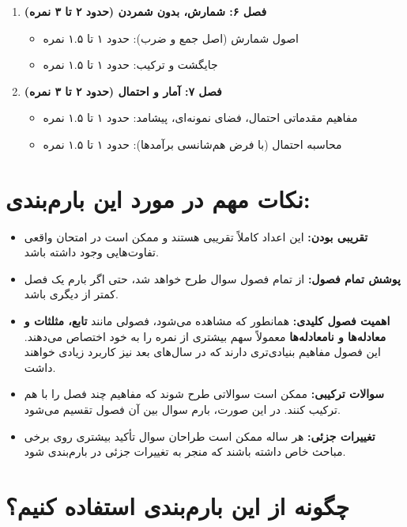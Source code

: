 \documentclass[12pt,a4paper]{article}
\begin{document}
\begin{enumerate}[label=\textbf{\arabic*.}, wide, labelindent=0pt]
    \item \textbf{فصل ۶: شمارش، بدون شمردن (حدود ۲ تا ۳ نمره)}
    \begin{itemize}
        \item اصول شمارش (اصل جمع و ضرب): حدود ۱ تا ۱.۵ نمره
        \item جایگشت و ترکیب: حدود ۱ تا ۱.۵ نمره
    \end{itemize}

    \item \textbf{فصل ۷: آمار و احتمال (حدود ۲ تا ۳ نمره)}
    \begin{itemize}
        \item مفاهیم مقدماتی احتمال، فضای نمونه‌ای، پیشامد: حدود ۱ تا ۱.۵ نمره
        \item محاسبه احتمال (با فرض هم‌شانسی برآمدها): حدود ۱ تا ۱.۵ نمره
    \end{itemize}
\end{enumerate}

\section*{نکات مهم در مورد این بارم‌بندی:}

\begin{itemize}
    \item \textbf{تقریبی بودن:} این اعداد کاملاً تقریبی هستند و ممکن است در امتحان واقعی تفاوت‌هایی وجود داشته باشد.
    \item \textbf{پوشش تمام فصول:} از تمام فصول سوال طرح خواهد شد، حتی اگر بارم یک فصل کمتر از دیگری باشد.
    \item \textbf{اهمیت فصول کلیدی:} همانطور که مشاهده می‌شود، فصولی مانند \textbf{تابع، مثلثات و معادله‌ها و نامعادله‌ها} معمولاً سهم بیشتری از نمره را به خود اختصاص می‌دهند. این فصول مفاهیم بنیادی‌تری دارند که در سال‌های بعد نیز کاربرد زیادی خواهند داشت.
    \item \textbf{سوالات ترکیبی:} ممکن است سوالاتی طرح شوند که مفاهیم چند فصل را با هم ترکیب کنند. در این صورت، بارم سوال بین آن فصول تقسیم می‌شود.
    \item \textbf{تغییرات جزئی:} هر ساله ممکن است طراحان سوال تأکید بیشتری روی برخی مباحث خاص داشته باشند که منجر به تغییرات جزئی در بارم‌بندی شود.
\end{itemize}

\section*{چگونه از این بارم‌بندی استفاده کنیم؟}
\end{document}
